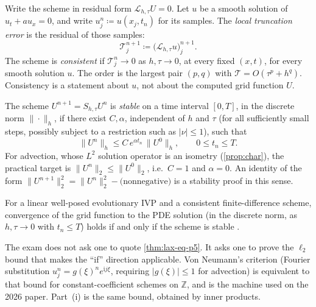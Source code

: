 \begin{definition}
\label{def:truncation-p5}
Write the scheme in residual form \(\mathcal{L}_{h,\tau}U=0\). Let \(u\) be a smooth solution of \(u_t+a u_x=0\), and write \(u_j^n\coloneqq u(x_j,t_n)\) for its samples. The \emph{local truncation error} is the residual of those samples:
\[
\mathcal{T}_j^{n+1}
\coloneqq
\bigl(\mathcal{L}_{h,\tau} u\bigr)_j^{n+1}.
\]
The scheme is \emph{consistent} if \(\mathcal{T}_j^n\to 0\) as \(h,\tau\to 0\), at every fixed \((x,t)\), for every smooth solution \(u\). The order is the largest pair \((p,q)\) with \(\mathcal{T}=O(\tau^p+h^q)\). Consistency is a statement about \(u\), not about the computed grid function \(U\).
\end{definition}

\begin{definition}
\label{def:stability-p5}
The scheme \(U^{n+1}=S_{h,\tau}U^n\) is \emph{stable} on a time interval \([0,T]\), in the discrete norm \(\|\cdot\|_h\), if there exist \(C,\alpha\), independent of \(h\) and \(\tau\) (for all sufficiently small steps, possibly subject to a restriction such as \(\lvert\nu\rvert\le 1\)), such that
\[
\|U^n\|_h
\le
C\,e^{\alpha t_n}\,\|U^0\|_h,
\qquad
0\le t_n\le T.
\]
For advection, whose \(L^2\) solution operator is an isometry (\cref{prop:char}), the practical target is \(\|U^n\|_2\le\|U^0\|_2\), i.e.\ \(C=1\) and \(\alpha=0\). An identity of the form \(\|U^{n+1}\|_2^2=\|U^n\|_2^2-\text{(nonnegative)}\) is a stability proof in this sense.
\end{definition}

\begin{theorem}
\label{thm:lax-eq-p5}
For a linear well-posed evolutionary IVP and a consistent finite-difference scheme, convergence of the grid function to the PDE solution (in the discrete norm, as \(h,\tau\to 0\) with \(t_n\le T\)) holds if and only if the scheme is stable \cite{laxrichtmyer56,leveque07,gko95}.
\end{theorem}

The exam does not ask one to quote \cref{thm:lax-eq-p5}. It asks one to prove the \(\ell_2\) bound that makes the ``if'' direction applicable. Von Neumann's criterion (Fourier substitution \(u_j^n=g(\xi)^n e^{\mathrm{i} j\xi}\), requiring \(\lvert g(\xi)\rvert\le 1\) for advection) is equivalent to that bound for constant-coefficient schemes on \(\mathbb{Z}\), and is the machine used on the 2026 paper. Part~(i) is the same bound, obtained by inner products.

